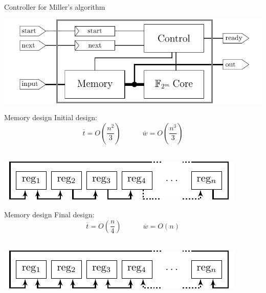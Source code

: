 \documentclass[svgnames]{beamer}
\newenvironment{changemargin}[2]{%
\begin{list}{}{%
\setlength{\topsep}{0pt}%
\setlength{\leftmargin}{#1}%
\setlength{\rightmargin}{#2}%
\setlength{\listparindent}{\parindent}%
\setlength{\itemindent}{\parindent}%
\setlength{\parsep}{\parskip}%
}%
\item[]}{\end{list}}
\begin{document}
\begin{frame}{Controller for Miller's algorithm}
\vfill
	\begin{changemargin}{-4cm}{-4cm}
		\begin{center}\includegraphics[width=1\paperwidth]{images/controller-miller}\end{center}
	\end{changemargin}
\vfill
\end{frame}

\begin{frame}{Memory design}
	Initial design:
	\[\overline{t} = O \left( \frac{n^2}{3} \right) \quad \qquad \overline{w} = O \left( \frac{n^3}{3} \right)\] \\[1.7em]
	
	\begin{changemargin}{-4cm}{-4cm}
		\begin{center}\includegraphics[width=0.8\paperwidth]{images/geheugen-circ}\end{center}
	\end{changemargin}
\end{frame}

\begin{frame}{Memory design}
	Final design:\\[0.3em]
	\[\overline{t} = O \left( \frac{n}{4} \right) \quad \qquad \overline{w} = O \left( n \right)\] \\[1.7em]
	
	\begin{changemargin}{-4cm}{-4cm}
		\begin{center}\includegraphics[width=0.8\paperwidth]{images/geheugen-circ-optimized}\end{center}
	\end{changemargin}
\end{frame}
\end{document}
